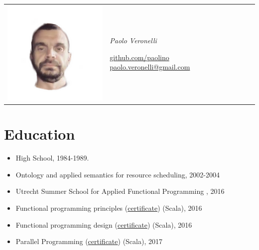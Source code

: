 \documentclass[letterpaper,10pt,oneside]{article}
\begin{document}
    \begin{tabular}{m{1.5in} m{2.7in}}
        \includegraphics[width=2in,right]{photo.png} &
        \vspace{0.5in}
        \Huge{\textit{Paolo Veronelli}}  \newline
        \begin{center}
        \normalsize{\href{https://github.com/paolino}{github.com/paolino}}  
        \newline
        \normalsize{\href{mailto:paolo.veronelli@gmail.com}{paolo.veronelli@gmail.com}}
        \end{center}
        \end{tabular}
    \vspace{0.2in}
    \section*{Education}
        \begin{itemize}
            \item High School, 1984-1989.
            \item Ontology and applied semantics for resource scheduling, 2002-2004 
            \item Utrecht Summer School for Applied Functional Programming , 2016
            \item Functional programming principles (\href{https://www.coursera.org/account/accomplishments/certificate/8NVXL4Y3XUB6}{certificate}) (Scala), 2016
            \item Functional programming design (\href{https://www.coursera.org/account/accomplishments/certificate/WTU8B8G54N79}{certificate}) (Scala), 2016
            \item Parallel Programming (\href{https://www.coursera.org/account/accomplishments/certificate/YU7BSRL8VFTT}{certificate}) (Scala), 2017
        \end{itemize}
\end{document}

